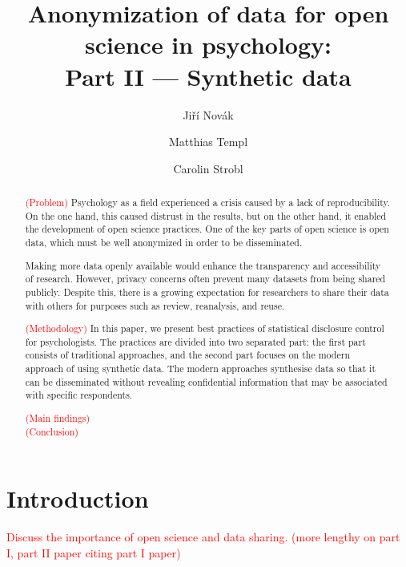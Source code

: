 \documentclass{article}
\title{Anonymization of data for open science in psychology: \\ 
       Part II — Synthetic data
}
\author{Jiří Novák \and 
        Matthias Templ \and 
        Carolin Strobl
        }
\begin{document}
\maketitle

\begin{abstract}
\textcolor{red}{(Problem)} Psychology as a field experienced a crisis caused by a lack of reproducibility. On the one hand, this caused distrust in the results, but on the other hand, it enabled the development of open science practices. One of the key parts of open science is open data, which must be well anonymized in order to be disseminated. 

Making more data openly available would enhance the transparency and accessibility of research. However, privacy concerns often prevent many datasets from being shared publicly. Despite this, there is a growing expectation for researchers to share their data with others for purposes such as review, reanalysis, and reuse.

\textcolor{red}{(Methodology)} In this paper, we present best practices of statistical disclosure control for psychologists. The practices are divided into two separated part: the first part consists of traditional approaches, and the second part focuses on the modern approach of using synthetic data.
The modern approaches synthesise data so that it can be disseminated without revealing confidential information that may be associated with specific respondents. 

\textcolor{red}{(Main findings)} \\ 
\textcolor{red}{(Conclusion)} \\ 

\end{abstract}


\section{Introduction}

\textcolor{red}{Discuss the importance of open science and data sharing. (more lengthy on part I, part II paper citing part I paper)}
\end{document}
